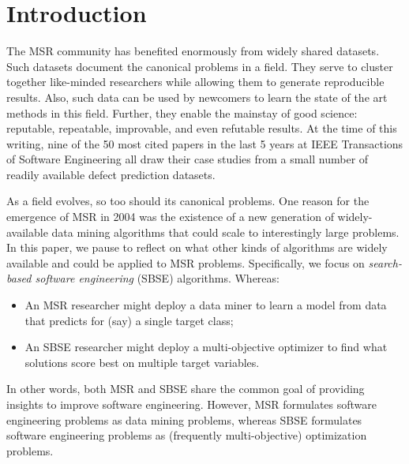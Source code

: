 \documentclass[sigconf,anonymous,review]{acmart}
\newcommand\TODO[1]{\textcolor{ScarletRed}{\textbf{\colorbox{yellow}{\small TODO:}} \emph{#1}}\xspace}
\begin{document}
\section{Introduction}


The MSR  community has benefited enormously from widely shared datasets.  Such datasets document the canonical problems in a field.
They serve to cluster together like-minded researchers while allowing them to generate reproducible results. Also, such data can be used by
   newcomers to learn the state of the art methods in this field. Further, they enable the mainstay of good science:
reputable, repeatable,  improvable, and even refutable results.
At the time of this writing,   nine of the 50 most cited papers in the last 5 years at IEEE Transactions of Software Engineering {all draw their case studies
from a small number of readily available defect prediction datasets.} 


As a field evolves, so too should its canonical problems. One  reason for the emergence of   MSR  in 2004 was the existence of a new generation of widely-available data mining
algorithms that could scale to interestingly large problems. In this paper,
we pause to reflect on what other kinds of algorithms are widely available and could
be applied to MSR problems.  Specifically, we focus on
{\em search-based software engineering} (SBSE) algorithms. Whereas:
\begin{itemize}[leftmargin=*]
\item
An MSR researcher might deploy a
data miner to learn a model from  data   that predicts for (say) a single target class;
\item
An SBSE researcher might deploy a multi-objective optimizer
to find what {solutions} score best
on multiple target variables.
\end{itemize}

{In other words, both MSR and SBSE share the common goal of providing insights to improve software engineering. However, MSR formulates software engineering problems as data mining problems, whereas SBSE formulates software engineering problems as (frequently multi-objective) optimization problems.}
\end{document}
